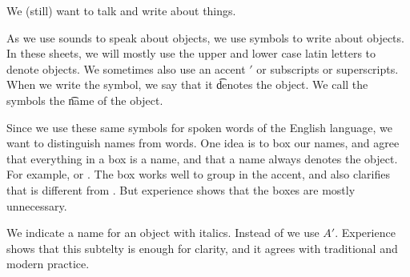 

We (still) want to talk and write about things.


As we use sounds to speak about objects, we use symbols to write about objects.
In these sheets, we will mostly use the upper and lower case latin letters to denote objects.
We sometimes also use an accent $'$ or subscripts or superscripts.
When we write the symbol, we say that it \t{denotes} the object.
We call the symbols the \t{name} of the object.

Since we use these same symbols for spoken words of the English language,
we want to distinguish names from words.
One idea is to box our names, and agree that everything in a box is a name, and that a name always denotes the object.
For example,  or .
The box works well to group in the accent, and also clarifies that  is different from .
But experience shows that the boxes are mostly unnecessary.

We indicate a name for an object with italics.
Instead of  we use $A'$.
Experience shows that this subtelty is enough for clarity, and it agrees with traditional and modern practice.


